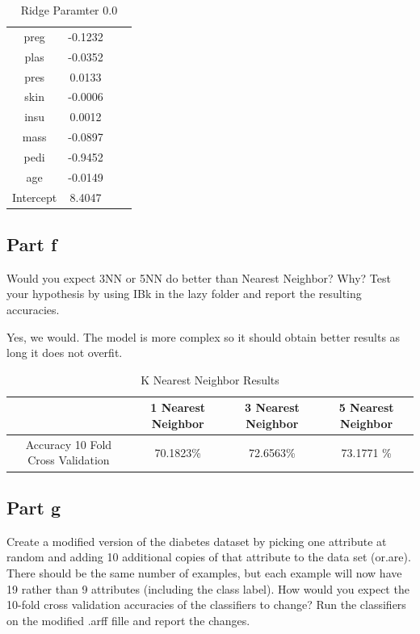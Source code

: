 \documentclass{article}
\begin{document}
\begin{table}[H]
    \begin{center}
    \caption{Ridge Paramter 0.0}
    \begin{tabular}{|c|c|c|c|}
   \hline
preg          &       -0.1232\\
plas             &      -0.0352\\
pres               &    0.0133\\
skin              &   -0.0006\\
insu               &    0.0012\\
mass              &     -0.0897\\
pedi             &     -0.9452\\
age            &        -0.0149\\
Intercept      &        8.4047\\ %
\hline
    \end{tabular}
    \end{center}
\end{table}


\subsection{Part f}
Would you expect 3NN or 5NN do better than Nearest Neighbor? Why? Test your hypothesis by using IBk in the lazy folder and report the resulting accuracies.

Yes, we would. The model is more complex so it should obtain better results as long it does not overfit. 


\begin{table}[H]
    \begin{center}
    \caption{K Nearest Neighbor Results}
    \begin{tabular}{|c|c|c|c|}
   \hline
        & 1 Nearest Neighbor & 3 Nearest Neighbor  & 5 Nearest Neighbor  \\ \hline
         Accuracy 10 Fold Cross Validation &  70.1823\%&72.6563\% &  73.1771 \%   \\ \hline
       
             
     
    \end{tabular}
    \end{center}
\end{table}

\subsection{Part g}
Create a modified version of the diabetes dataset by picking one attribute at random and adding 10 additional copies of that attribute to the data set (or.are). There should be the same number of examples, but each example will now have 19 rather than 9 attributes (including the class label). How would you expect the 10-fold cross validation accuracies of the classifiers to change? Run the classifiers on the modified .arff fille and report the changes.
\end{document}
